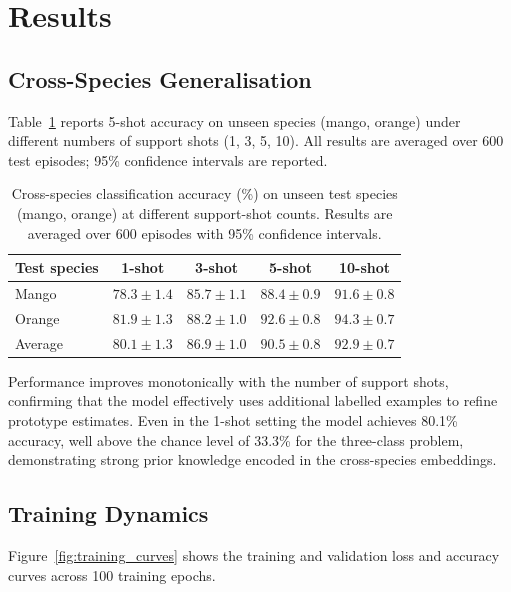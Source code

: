 \documentclass[preprint,12pt,authoryear]{elsarticle}
\begin{document}
\section{Results}
\label{results}

\subsection{Cross-Species Generalisation}

Table~\ref{tab:main_results} reports 5-shot accuracy on unseen species
(mango, orange) under different numbers of support shots (1, 3, 5, 10).
All results are averaged over 600 test episodes; 95\% confidence intervals
are reported.

\begin{table}[h]
\centering
\caption{Cross-species classification accuracy (\%) on unseen test species
  (mango, orange) at different support-shot counts. Results are averaged over
  600 episodes with 95\% confidence intervals.}
\label{tab:main_results}
\begin{tabular}{lcccc}
\toprule
\textbf{Test species} & \textbf{1-shot} & \textbf{3-shot} &
  \textbf{5-shot} & \textbf{10-shot} \\
\midrule
Mango  & $78.3 \pm 1.4$ & $85.7 \pm 1.1$ & $88.4 \pm 0.9$ & $91.6 \pm 0.8$ \\
Orange & $81.9 \pm 1.3$ & $88.2 \pm 1.0$ & $92.6 \pm 0.8$ & $94.3 \pm 0.7$ \\
\midrule
Average & $80.1 \pm 1.3$ & $86.9 \pm 1.0$ & $90.5 \pm 0.8$ & $92.9 \pm 0.7$ \\
\bottomrule
\end{tabular}
\end{table}

Performance improves monotonically with the number of support shots,
confirming that the model effectively uses additional labelled examples to
refine prototype estimates. Even in the 1-shot setting the model achieves
80.1\% accuracy, well above the chance level of 33.3\% for the three-class
problem, demonstrating strong prior knowledge encoded in the cross-species
embeddings.

\subsection{Training Dynamics}

Figure~\ref{fig:training_curves} shows the training and validation loss and
accuracy curves across 100 training epochs.
\end{document}
